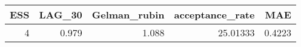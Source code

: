 \begin{longtable}{rrrrr}
\toprule
ESS & LAG\_30 & Gelman\_rubin & acceptance\_rate & MAE \\ 
\midrule
4 & 0.979 & 1.088 & 25.01333 & 0.4223 \\ 
\bottomrule
\end{longtable}


